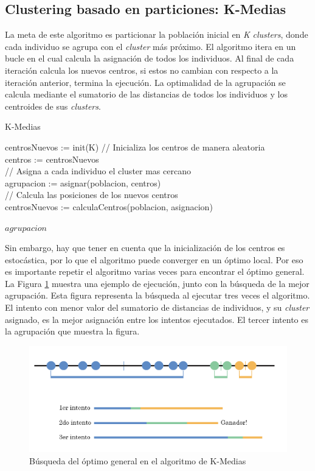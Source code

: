 	\subsection{Clustering basado en particiones: K-Medias}

		La meta de este algoritmo es particionar la población inicial en \textit{K} \textit{clusters}, donde cada individuo se agrupa con el \textit{cluster} más próximo. El algoritmo itera en un bucle en el cual calcula la asignación de todos los individuos. Al final de cada iteración calcula los nuevos centros, si estos no cambian con respecto a la iteración anterior, termina la ejecución. La optimalidad de la agrupación se calcula mediante el sumatorio de las distancias de todos los individuos y los centroides de sus \textit{clusters}. 
		
		
		\begin{algorithm}[!h]
			\caption{K-Medias}
			centrosNuevos := init(K) // Inicializa los centros de manera aleatoria\\
			
			{
				centros := centrosNuevos\\
				// Asigna a cada individuo el cluster mas cercano\\
				agrupacion := asignar(poblacion, centros)\\
				// Calcula las posiciones de los nuevos centros\\
				centrosNuevos := calculaCentros(poblacion, asignacion)
			}
			
			
			\Return $agrupacion$\;
		\end{algorithm}
		
		Sin embargo, hay que tener en cuenta que la inicialización de los centros es estocástica, por lo que el algoritmo puede converger en un óptimo local. Por eso es importante repetir el algoritmo varias veces para encontrar el óptimo general. La Figura \ref{fig:kmediasBusqueda} muestra una ejemplo de ejecución, junto con la búsqueda de la mejor agrupación. Esta figura representa la búsqueda al ejecutar tres veces el algoritmo. El intento con menor valor del sumatorio de distancias de individuos, y su \textit{cluster} asignado, es la mejor asignación entre los intentos ejecutados. El tercer intento es la agrupación que muestra la figura.


		\begin{figure}[!h]
			\centering
			\includegraphics[width=1\textwidth]{images/chapter_2/kmedias}
			\caption{Búsqueda del óptimo general en el algoritmo de K-Medias}
			\label{fig:kmediasBusqueda}
		\end{figure}


